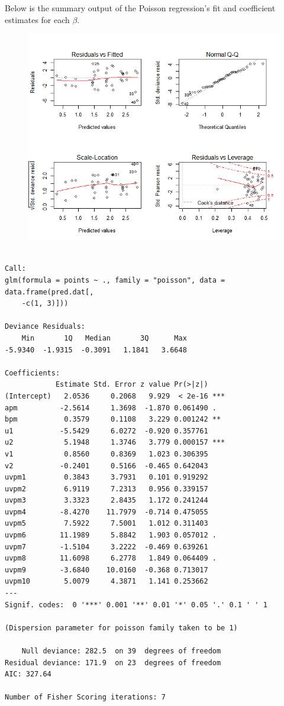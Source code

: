 \documentclass[12pt,twoside]{dukestatscithesis}
\theoremstyle{definition}
\theoremstyle{definition}
\theoremstyle{definition}
\theoremstyle{remark}
\begin{document}
Below is the summary output of the Poisson regression's fit and
coefficient estimates for each \(\beta\).
\begin{figure}
\centering
\includegraphics{img/poissonsummary2.png}
\caption{}
\end{figure}
\begin{verbatim}

Call:
glm(formula = points ~ ., family = "poisson", data = data.frame(pred.dat[, 
    -c(1, 3)]))

Deviance Residuals: 
    Min       1Q   Median       3Q      Max  
-5.9340  -1.9315  -0.3091   1.1841   3.6648  

Coefficients:
            Estimate Std. Error z value Pr(>|z|)    
(Intercept)   2.0536     0.2068   9.929  < 2e-16 ***
apm          -2.5614     1.3698  -1.870 0.061490 .  
bpm           0.3579     0.1108   3.229 0.001242 ** 
u1           -5.5429     6.0272  -0.920 0.357761    
u2            5.1948     1.3746   3.779 0.000157 ***
v1            0.8560     0.8369   1.023 0.306395    
v2           -0.2401     0.5166  -0.465 0.642043    
uvpm1         0.3843     3.7931   0.101 0.919292    
uvpm2         6.9119     7.2313   0.956 0.339157    
uvpm3         3.3323     2.8435   1.172 0.241244    
uvpm4        -8.4270    11.7979  -0.714 0.475055    
uvpm5         7.5922     7.5001   1.012 0.311403    
uvpm6        11.1989     5.8842   1.903 0.057012 .  
uvpm7        -1.5104     3.2222  -0.469 0.639261    
uvpm8        11.6098     6.2778   1.849 0.064409 .  
uvpm9        -3.6840    10.0160  -0.368 0.713017    
uvpm10        5.0079     4.3871   1.141 0.253662    
---
Signif. codes:  0 '***' 0.001 '**' 0.01 '*' 0.05 '.' 0.1 ' ' 1

(Dispersion parameter for poisson family taken to be 1)

    Null deviance: 282.5  on 39  degrees of freedom
Residual deviance: 171.9  on 23  degrees of freedom
AIC: 327.64

Number of Fisher Scoring iterations: 7
\end{verbatim}
\end{document}
